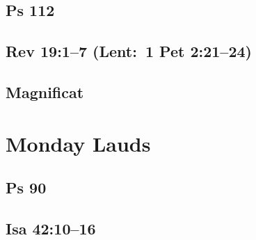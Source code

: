 \subsection{Ps 112}

{%
\parindent 0pt
\noindent
\ifx\preLilyPondExample \undefined
\else
  \expandafter\preLilyPondExample
\fi
\def\lilypondbook{}%

\ifx\postLilyPondExample \undefined
\else
  \expandafter\postLilyPondExample
\fi
}

\subsection{Rev 19:1--7 (Lent: 1 Pet 2:21--24)}

{%
\parindent 0pt
\noindent
\ifx\preLilyPondExample \undefined
\else
  \expandafter\preLilyPondExample
\fi
\def\lilypondbook{}%

\ifx\postLilyPondExample \undefined
\else
  \expandafter\postLilyPondExample
\fi
}

\subsection{Magnificat}

{%
\parindent 0pt
\noindent
\ifx\preLilyPondExample \undefined
\else
  \expandafter\preLilyPondExample
\fi
\def\lilypondbook{}%

\ifx\postLilyPondExample \undefined
\else
  \expandafter\postLilyPondExample
\fi
}


\section{Monday Lauds}

\subsection{Ps 90}

{%
\parindent 0pt
\noindent
\ifx\preLilyPondExample \undefined
\else
  \expandafter\preLilyPondExample
\fi
\def\lilypondbook{}%

\ifx\postLilyPondExample \undefined
\else
  \expandafter\postLilyPondExample
\fi
}

\subsection{Isa 42:10--16}

{%
\parindent 0pt
\noindent
\ifx\preLilyPondExample \undefined
\else
  \expandafter\preLilyPondExample
\fi
\def\lilypondbook{}%

\ifx\postLilyPondExample \undefined
\else
  \expandafter\postLilyPondExample
\fi
}

